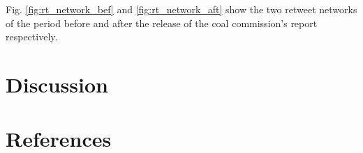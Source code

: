 \documentclass[12pt,onecolumn,twoside]{layout}
\begin{document}
Fig. \ref{fig:rt_network_bef} and \ref{fig:rt_network_aft} show the two retweet networks of the period before and after the release of the coal commission's report respectively. 

\section*{Discussion} \label{sec:discussion}





\clearpage
\section*{References}

\end{document}
